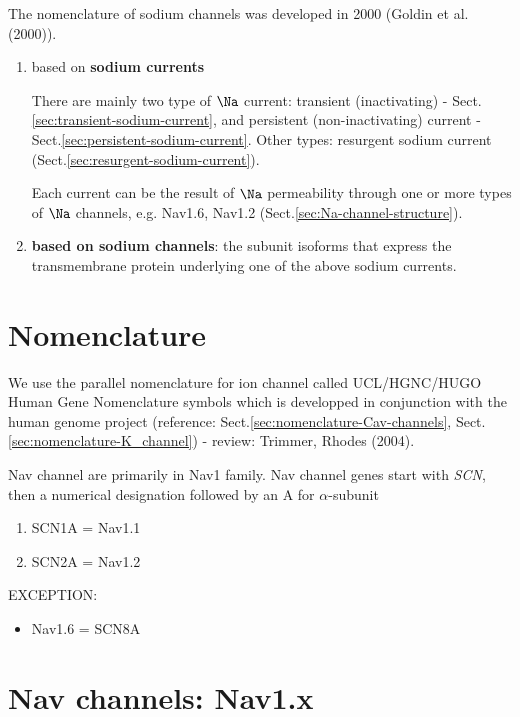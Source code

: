 The nomenclature of sodium channels was developed in 2000 (Goldin et al.
(2000)). 
\begin{enumerate}
  \item based on {\bf sodium currents}
  
There are mainly two type of $\Na$ current: transient (inactivating) -
Sect.\ref{sec:transient-sodium-current}, and persistent (non-inactivating)
current - Sect.\ref{sec:persistent-sodium-current}. Other types:
resurgent sodium current (Sect.\ref{sec:resurgent-sodium-current}).

Each current can be the result of $\Na$ permeability through one or more types
of $\Na$ channels, e.g. Nav1.6, Nav1.2 (Sect.\ref{sec:Na-channel-structure}).
  
  \item {\bf based on sodium channels}: the subunit isoforms that express the
  transmembrane protein underlying one of the above sodium currents.
\end{enumerate}

\section{Nomenclature}
\label{sec:nomenclature-Na-channel}

We use the parallel nomenclature for ion channel called UCL/HGNC/HUGO Human Gene
Nomenclature symbols which is developped in conjunction with the human genome
project (reference: Sect.\ref{sec:nomenclature-Cav-channels},
Sect.\ref{sec:nomenclature-K_channel}) - review: Trimmer, Rhodes (2004).

Nav channel are primarily in Nav1 family.
Nav channel genes start with {\it SCN}, then a numerical designation followed by
an A for $\alpha$-subunit
\begin{enumerate}
  \item SCN1A = Nav1.1
  \item SCN2A = Nav1.2
\end{enumerate}
EXCEPTION: 
\begin{itemize}
  \item Nav1.6 = SCN8A 
\end{itemize}


\section{Nav channels: Nav1.x}
\label{sec:Nav-channels}
\label{sec:Nav1-family}



